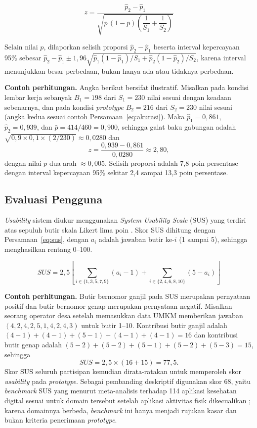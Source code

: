 \begin{equation}
  z = \frac{\hat{p}_2 - \hat{p}_1}{\sqrt{\bar{p}\,(1 - \bar{p})\left(\dfrac{1}{S_1} + \dfrac{1}{S_2}\right)}}
  \label{eq:zdua}
\end{equation}

\noindent Selain nilai $p$, dilaporkan selisih proporsi $\hat{p}_2 - \hat{p}_1$ beserta interval kepercayaan 95\% sebesar $\hat{p}_2 - \hat{p}_1 \pm 1{,}96\sqrt{\hat{p}_1(1-\hat{p}_1)/S_1 + \hat{p}_2(1-\hat{p}_2)/S_2}$, karena interval menunjukkan besar perbedaan, bukan hanya ada atau tidaknya perbedaan.

\noindent\textbf{Contoh perhitungan.} Angka berikut bersifat ilustratif. Misalkan pada kondisi lembar kerja sebanyak $B_1 = 198$ dari $S_1 = 230$ nilai sesuai dengan keadaan sebenarnya, dan pada kondisi \textit{prototype} $B_2 = 216$ dari $S_2 = 230$ nilai sesuai (angka kedua sesuai contoh Persamaan~\eqref{eq:akurasi}). Maka $\hat{p}_1 = 0{,}861$, $\hat{p}_2 = 0{,}939$, dan $\bar{p} = 414/460 = 0{,}900$, sehingga galat baku gabungan adalah $\sqrt{0{,}9 \times 0{,}1 \times (2/230)} \approx 0{,}0280$ dan
\[
  z = \frac{0{,}939 - 0{,}861}{0{,}0280} \approx 2{,}80,
\]
dengan nilai $p$ dua arah $\approx 0{,}005$. Selisih proporsi adalah 7,8 poin persentase dengan interval kepercayaan 95\% sekitar 2,4 sampai 13,3 poin persentase.

\subsection{Evaluasi Pengguna}
\label{sec:evaluasi-pengguna}

\textit{Usability} sistem diukur menggunakan \textit{System Usability Scale} (SUS) yang terdiri atas sepuluh butir skala Likert lima poin \cite{brooke1996sus}. Skor SUS dihitung dengan Persamaan~\eqref{eq:sus}, dengan $a_i$ adalah jawaban butir ke-$i$ (1 sampai 5), sehingga menghasilkan rentang 0--100.

\begin{equation}
  SUS = 2{,}5 \left[ \sum_{i \in \{1,3,5,7,9\}} (a_i - 1) + \sum_{i \in \{2,4,6,8,10\}} (5 - a_i) \right]
  \label{eq:sus}
\end{equation}

\noindent\textbf{Contoh perhitungan.} Butir bernomor ganjil pada SUS merupakan pernyataan positif dan butir bernomor genap merupakan pernyataan negatif. Misalkan seorang operator desa setelah memasukkan data UMKM memberikan jawaban $(4, 2, 4, 2, 5, 1, 4, 2, 4, 3)$ untuk butir 1--10. Kontribusi butir ganjil adalah $(4-1) + (4-1) + (5-1) + (4-1) + (4-1) = 16$ dan kontribusi butir genap adalah $(5-2) + (5-2) + (5-1) + (5-2) + (5-3) = 15$, sehingga
\[
  SUS = 2{,}5 \times (16 + 15) = 77{,}5.
\]
Skor SUS seluruh partisipan kemudian dirata-ratakan untuk memperoleh skor \textit{usability} pada \textit{prototype}. Sebagai pembanding deskriptif digunakan skor 68, yaitu \textit{benchmark} SUS yang menurut meta-analisis terhadap 114 aplikasi kesehatan digital sesuai untuk domain tersebut setelah aplikasi aktivitas fisik dikecualikan \cite{hyzy2022sus}; karena domainnya berbeda, \textit{benchmark} ini hanya menjadi rujukan kasar dan bukan kriteria penerimaan \textit{prototype}.

